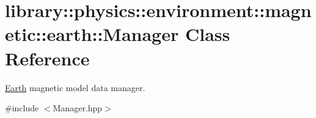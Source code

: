 \hypertarget{classlibrary_1_1physics_1_1environment_1_1magnetic_1_1earth_1_1_manager}{}\section{library\+:\+:physics\+:\+:environment\+:\+:magnetic\+:\+:earth\+:\+:Manager Class Reference}
\label{classlibrary_1_1physics_1_1environment_1_1magnetic_1_1earth_1_1_manager}


\hyperlink{classlibrary_1_1physics_1_1environment_1_1magnetic_1_1_earth}{Earth} magnetic model data manager.  




{\ttfamily \#include $<$Manager.\+hpp$>$}

